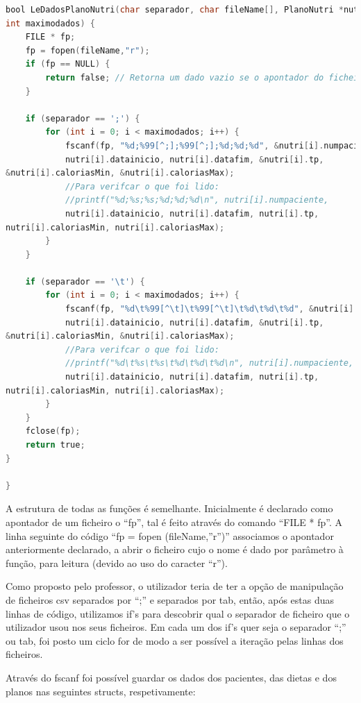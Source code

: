 \documentclass[a4wide]{report}
\begin{document}
\begin{lstlisting}[language=C, caption={Funções de ler dados}, label={lst:exemplo-c}]
bool LeDadosPlanoNutri(char separador, char fileName[], PlanoNutri *nutri,
int maximodados) {
    FILE * fp;
    fp = fopen(fileName,"r");
    if (fp == NULL) {
        return false; // Retorna um dado vazio se o apontador do ficheiro for nulo
    }

    if (separador == ';') {
        for (int i = 0; i < maximodados; i++) {
            fscanf(fp, "%d;%99[^;];%99[^;];%d;%d;%d", &nutri[i].numpaciente,
            nutri[i].datainicio, nutri[i].datafim, &nutri[i].tp,
&nutri[i].caloriasMin, &nutri[i].caloriasMax);
            //Para verifcar o que foi lido:
            //printf("%d;%s;%s;%d;%d;%d\n", nutri[i].numpaciente,
            nutri[i].datainicio, nutri[i].datafim, nutri[i].tp,
nutri[i].caloriasMin, nutri[i].caloriasMax);
        }
    }

    if (separador == '\t') {
        for (int i = 0; i < maximodados; i++) {
            fscanf(fp, "%d\t%99[^\t]\t%99[^\t]\t%d\t%d\t%d", &nutri[i].numpaciente,
            nutri[i].datainicio, nutri[i].datafim, &nutri[i].tp,
&nutri[i].caloriasMin, &nutri[i].caloriasMax);
            //Para verifcar o que foi lido:
            //printf("%d\t%s\t%s\t%d\t%d\t%d\n", nutri[i].numpaciente,
            nutri[i].datainicio, nutri[i].datafim, nutri[i].tp,
nutri[i].caloriasMin, nutri[i].caloriasMax);
        }
    }
    fclose(fp);
    return true;
}

}
\end{lstlisting}
	

A estrutura de todas as funções é semelhante. Inicialmente é declarado como apontador de um ficheiro o “fp”, tal é feito através do comando “FILE * fp”. A linha seguinte do código “fp = fopen (fileName,”r”)” associamos o apontador anteriormente declarado, a abrir o ficheiro cujo o nome é dado por parâmetro à função, para leitura (devido ao uso do caracter “r”). 

	Como proposto pelo professor, o utilizador teria de ter a opção de manipulação de ficheiros csv separados por “;” e separados por tab, então, após estas duas linhas de código, utilizamos if’s para descobrir qual o separador de ficheiro que o utilizador usou nos seus ficheiros. Em cada um dos if’s quer seja o separador “;” ou tab, foi posto um ciclo for de modo a ser possível a iteração pelas linhas dos ficheiros. 

\newpage
Através do fscanf foi possível guardar os dados dos pacientes, das dietas e dos planos nas seguintes structs, respetivamente:  
\end{document}
